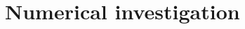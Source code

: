 \documentclass[11pt]{elsarticle}
\theoremstyle{plain}
\theoremstyle{definition}
\theoremstyle{myremark}
\begin{document}



\section{Numerical investigation}\label{sec:sim}
\end{document}
